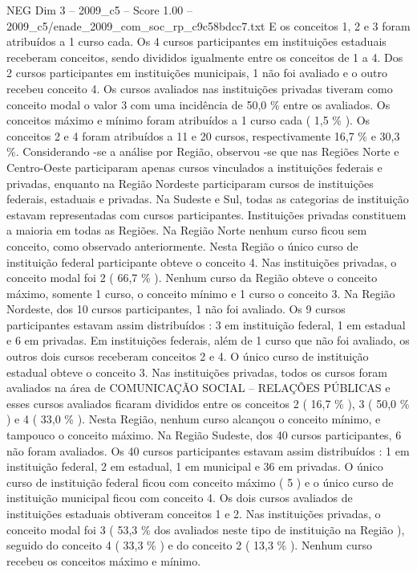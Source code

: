 \begin{textsample}{NEG Dim 3 – 2009\_c5 – Score 1.00 – 2009\_c5/enade\_2009\_com\_soc\_rp\_c9c58bdcc7.txt}
E os conceitos 1, 2 e 3 foram atribuídos a 1 curso cada.
Os 4 cursos participantes em instituições estaduais receberam conceitos, sendo divididos igualmente entre os conceitos de 1 a 4.
Dos 2 cursos participantes em instituições municipais, 1 não foi avaliado e o outro recebeu conceito 4.
Os cursos avaliados nas instituições privadas tiveram como conceito modal o valor 3 com uma incidência de 50,0 \% entre os avaliados.
Os conceitos máximo e mínimo foram atribuídos a 1 curso cada ( 1,5 \% ).
Os conceitos 2 e 4 foram atribuídos a 11 e 20 cursos, respectivamente 16,7 \% e 30,3 \%.
Considerando -se a análise por Região, observou -se que nas Regiões Norte e Centro-Oeste participaram apenas cursos vinculados a instituições federais e privadas, enquanto na Região Nordeste participaram cursos de instituições federais, estaduais e privadas.
Na Sudeste e Sul, todas as categorias de instituição estavam representadas com cursos participantes.
Instituições privadas constituem a maioria em todas as Regiões.
Na Região Norte nenhum curso ficou sem conceito, como observado anteriormente.
Nesta Região o único curso de instituição federal participante obteve o conceito 4.
Nas instituições privadas, o conceito modal foi 2 ( 66,7 \% ).
Nenhum curso da Região obteve o conceito máximo, somente 1 curso, o conceito mínimo e 1 curso o conceito 3.
Na Região Nordeste, dos 10 cursos participantes, 1 não foi avaliado.
Os 9 cursos participantes estavam assim distribuídos : 3 em instituição federal, 1 em estadual e 6 em privadas.
Em instituições federais, além de 1 curso que não foi avaliado, os outros dois cursos receberam conceitos 2 e 4.
O único curso de instituição estadual obteve o conceito 3.
Nas instituições privadas, todos os cursos foram avaliados na área de COMUNICAÇÃO SOCIAL – RELAÇÕES PÚBLICAS e esses cursos avaliados ficaram divididos entre os conceitos 2 ( 16,7 \% ), 3 ( 50,0 \% ) e 4 ( 33,0 \% ).
Nesta Região, nenhum curso alcançou o conceito mínimo, e tampouco o conceito máximo.
Na Região Sudeste, dos 40 cursos participantes, 6 não foram avaliados.
Os 40 cursos participantes estavam assim distribuídos : 1 em instituição federal, 2 em estadual, 1 em municipal e 36 em privadas.
O único curso de instituição federal ficou com conceito máximo ( 5 ) e o único curso de instituição municipal ficou com conceito 4.
Os dois cursos avaliados de instituições estaduais obtiveram conceitos 1 e 2.
Nas instituições privadas, o conceito modal foi 3 ( 53,3 \% dos avaliados neste tipo de instituição na Região ), seguido do conceito 4 ( 33,3 \% ) e do conceito 2 ( 13,3 \% ).
Nenhum curso recebeu os conceitos máximo e mínimo.

\end{textsample}
